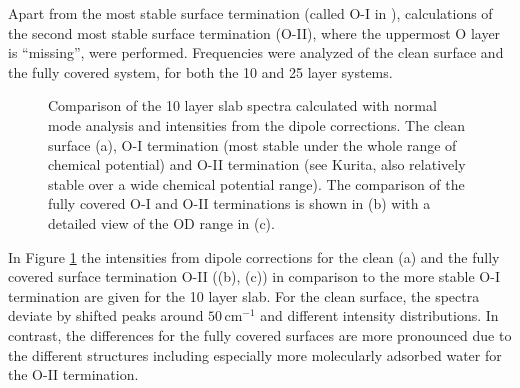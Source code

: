 \documentclass[11pt,DIV=13,BCOR=5mm,a4paper,headinclude]{scrbook}
\begin{document}
Apart from the most stable surface termination (called O-I in \cite{kuri10}), calculations of the second most stable surface termination (O-II), where the uppermost O layer is ``missing'', were performed.
Frequencies were analyzed of the clean surface and the fully covered system, for both the 10 and 25 layer systems.
\begin{figure}[!h]
 \centering
 \quad
 \quad
 \caption{Comparison of the 10 layer slab spectra calculated with normal mode analysis and intensities from the dipole corrections.
The clean surface (a), O-I termination (most stable under the whole range of chemical potential) and O-II termination (see Kurita\cite{kuri10}, also relatively stable over a wide chemical potential range).
The comparison of the fully covered O-I and O-II terminations is shown in (b) with a detailed view of the OD range in (c).}
 \label{abb:comp_O-I-O-II}
\end{figure}
In Figure \ref{abb:comp_O-I-O-II} the intensities from dipole corrections for the clean (a) and the fully covered surface termination O-II ((b), (c)) in comparison to the more stable O-I termination are given for the 10 layer slab.
For the clean surface, the spectra deviate by shifted peaks around $50\,$cm$^{-1}$ and different intensity distributions.
In contrast, the differences for the fully covered surfaces are more pronounced due to the different structures including especially more molecularly adsorbed water for the O-II termination.
\end{document}
